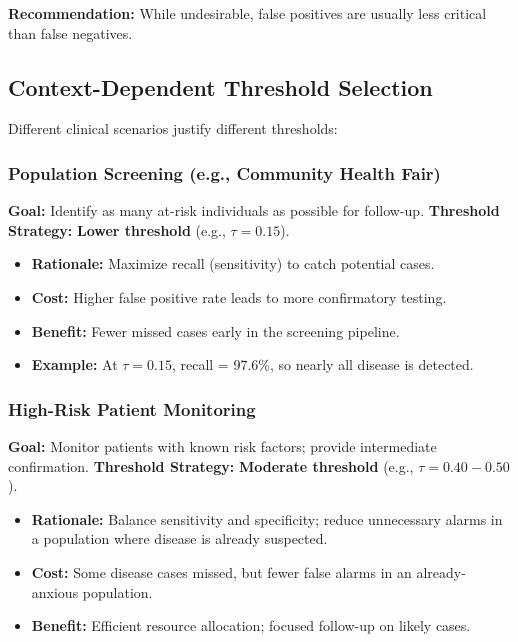 \documentclass[11pt]{article}
\begin{document}
\textbf{Recommendation:} While undesirable, false positives are usually less critical than false negatives.

\subsection{Context-Dependent Threshold Selection}

Different clinical scenarios justify different thresholds:

\subsubsection{Population Screening (e.g., Community Health Fair)}

\textbf{Goal:} Identify as many at-risk individuals as possible for follow-up.
\textbf{Threshold Strategy:} \textbf{Lower threshold} (e.g., $\tau = 0.15$).

\begin{itemize}
    \item \textbf{Rationale:} Maximize recall (sensitivity) to catch potential cases.
    \item \textbf{Cost:} Higher false positive rate leads to more confirmatory testing.
    \item \textbf{Benefit:} Fewer missed cases early in the screening pipeline.
    \item \textbf{Example:} At $\tau = 0.15$, recall = 97.6\%, so nearly all disease is detected.
\end{itemize}

\subsubsection{High-Risk Patient Monitoring}

\textbf{Goal:} Monitor patients with known risk factors; provide intermediate confirmation.
\textbf{Threshold Strategy:} \textbf{Moderate threshold} (e.g., $\tau = 0.40-0.50$).

\begin{itemize}
    \item \textbf{Rationale:} Balance sensitivity and specificity; reduce unnecessary alarms in a population where disease is already suspected.
    \item \textbf{Cost:} Some disease cases missed, but fewer false alarms in an already-anxious population.
    \item \textbf{Benefit:} Efficient resource allocation; focused follow-up on likely cases.
\end{itemize}
\end{document}

